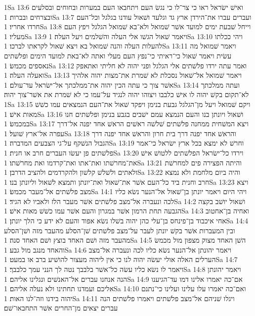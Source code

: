 1Sa 13:6  ואישׁ ישׂראל ראו כי צר־לו כי נגשׂ העם ויתחבאו העם במערות ובחוחים ובסלעים ובצרחים ובברות׃
1Sa 13:7  ועברים עברו את־הירדן ארץ גד וגלעד ושׁאול עודנו בגלגל וכל־העם חרדו אחריו׃
1Sa 13:8  וייחל שׁבעת ימים למועד אשׁר שׁמואל ולא־בא שׁמואל הגלגל ויפץ העם מעליו׃
1Sa 13:9  ויאמר שׁאול הגשׁו אלי העלה והשׁלמים ויעל העלה׃
1Sa 13:10  ויהי ככלתו להעלות העלה והנה שׁמואל בא ויצא שׁאול לקראתו לברכו׃
1Sa 13:11  ויאמר שׁמואל מה עשׂית ויאמר שׁאול כי־ראיתי כי־נפץ העם מעלי ואתה לא־באת למועד הימים ופלשׁתים נאספים מכמשׂ׃
1Sa 13:12  ואמר עתה ירדו פלשׁתים אלי הגלגל ופני יהוה לא חליתי ואתאפק ואעלה העלה׃
1Sa 13:13  ויאמר שׁמואל אל־שׁאול נסכלת לא שׁמרת את־מצות יהוה אלהיך אשׁר צוך כי עתה הכין יהוה את־ממלכתך אל־ישׂראל עד־עולם׃
1Sa 13:14  ועתה ממלכתך לא־תקום בקשׁ יהוה לו אישׁ כלבבו ויצוהו יהוה לנגיד על־עמו כי לא שׁמרת את אשׁר־צוך יהוה׃
1Sa 13:15  ויקם שׁמואל ויעל מן־הגלגל גבעת בנימן ויפקד שׁאול את־העם הנמצאים עמו כשׁשׁ מאות אישׁ׃
1Sa 13:16  ושׁאול ויונתן בנו והעם הנמצא עמם ישׁבים בגבע בנימן ופלשׁתים חנו במכמשׂ׃
1Sa 13:17  ויצא המשׁחית ממחנה פלשׁתים שׁלשׁה ראשׁים הראשׁ אחד יפנה אל־דרך עפרה אל־ארץ שׁועל׃
1Sa 13:18  והראשׁ אחד יפנה דרך בית חרון והראשׁ אחד יפנה דרך הגבול הנשׁקף על־גי הצבעים המדברה׃
1Sa 13:19  וחרשׁ לא ימצא בכל ארץ ישׂראל כי־אמר פלשׁתים פן יעשׂו העברים חרב או חנית׃
1Sa 13:20  וירדו כל־ישׂראל הפלשׁתים ללטושׁ אישׁ את־מחרשׁתו ואת־אתו ואת־קרדמו ואת מחרשׁתו׃
1Sa 13:21  והיתה הפצירה פים למחרשׁת ולאתים ולשׁלשׁ קלשׁון ולהקרדמים ולהציב הדרבן׃
1Sa 13:22  והיה ביום מלחמת ולא נמצא חרב וחנית ביד כל־העם אשׁר את־שׁאול ואת־יונתן ותמצא לשׁאול וליונתן בנו׃
1Sa 13:23  ויצא מצב פלשׁתים אל־מעבר מכמשׂ׃
1Sa 14:1  ויהי היום ויאמר יונתן בן־שׁאול אל־הנער נשׂא כליו לכה ונעברה אל־מצב פלשׁתים אשׁר מעבר הלז ולאביו לא הגיד׃
1Sa 14:2  ושׁאול יושׁב בקצה הגבעה תחת הרמון אשׁר במגרון והעם אשׁר עמו כשׁשׁ מאות אישׁ׃
1Sa 14:3  ואחיה בן־אחטוב אחי איכבוד בן־פינחס בן־עלי כהן יהוה בשׁלו נשׂא אפוד והעם לא ידע כי הלך יונתן׃
1Sa 14:4  ובין המעברות אשׁר בקשׁ יונתן לעבר על־מצב פלשׁתים שׁן־הסלע מהעבר מזה ושׁן־הסלע מהעבר מזה ושׁם האחד בוצץ ושׁם האחד סנה׃
1Sa 14:5  השׁן האחד מצוק מצפון מול מכמשׂ והאחד מנגב מול גבע׃
1Sa 14:6  ויאמר יהונתן אל־הנער נשׂא כליו לכה ונעברה אל־מצב הערלים האלה אולי יעשׂה יהוה לנו כי אין ליהוה מעצור להושׁיע ברב או במעט׃
1Sa 14:7  ויאמר לו נשׂא כליו עשׂה כל־אשׁר בלבבך נטה לך הנני עמך כלבבך׃
1Sa 14:8  ויאמר יהונתן הנה אנחנו עברים אל־האנשׁים ונגלינו אליהם׃
1Sa 14:9  אם־כה יאמרו אלינו דמו עד־הגיענו אליכם ועמדנו תחתינו ולא נעלה אליהם׃
1Sa 14:10  ואם־כה יאמרו עלו עלינו ועלינו כי־נתנם יהוה בידנו וזה־לנו האות׃
1Sa 14:11  ויגלו שׁניהם אל־מצב פלשׁתים ויאמרו פלשׁתים הנה עברים יצאים מן־החרים אשׁר התחבאו־שׁם׃
